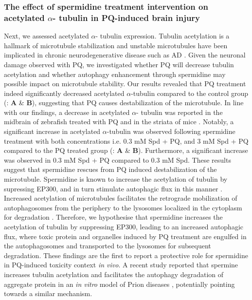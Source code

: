 \subsubsection{The effect of spermidine treatment intervention on acetylated $\alpha$- tubulin in PQ-induced brain injury}
Next, we assessed acetylated $\alpha$- tubulin expression. Tubulin acetylation is a hallmark of microtubule stabilization and unstable microtubules have been implicated in chronic neurodegenerative disease such as AD \citep{Phadwal2018}. Given the neuronal damage observed with PQ, we investigated whether PQ will decrease tubulin acetylation and whether autophagy enhancement through spermidine may possible impact on microtubule stability. Our results revealed that PQ treatment indeed significantly decreased acetylated $\alpha$-tubulin compared to the control group (: \textbf{A} \& \textbf{B}), suggesting that PQ causes destabilization of the microtubule. In line with our findings, a decrease in acetylated $\alpha$- tubulin was reported in the midbrain of zebrafish treated with PQ \citep{Poulin1995} and in the striata of mice \citep{Wills2012}. Notably, a significant increase in acetylated $\alpha$-tubulin was observed following spermidine treatment with both concentrations i.e. 0.3 mM Spd + PQ, and 3 mM Spd + PQ compared to the PQ treated group (: \textbf{A} \& \textbf{B}). Furthermore, a significant increase was observed in 0.3 mM Spd + PQ compared to 0.3 mM Spd. These results suggest that spermidine rescues from PQ induced destabilization of the microtubule. Spermidine is known to increase the acetylation of tubulin by supressing EP300, and in turn stimulate autophagic flux in this manner \citep{Madeo2018}. Increased acetylation of microtubules facilitates the retrograde mobilization of autophagosomes from the periphery to the lysosomes localized in the cytoplasm for degradation \citep{Phadwal2018,Xie2010}. Therefore, we hypothesise that spermidine increases the acetylation of tubulin by suppressing EP300, leading to an increased autophagic flux, where toxic protein and organelles induced by PQ treatment are engulfed in the autophagosomes and transported to the lysosomes for subsequent degradation. These findings are the first to report a protective role for spermidine in PQ-induced toxicity context \textit{in vivo}. A recent study reported that spermine increases tubulin acetylation and facilitates the autophagy degradation of aggregate protein in an \textit{in vitro} model of Prion diseases \citep{Phadwal2018}, potentially pointing towards a similar mechanism.

